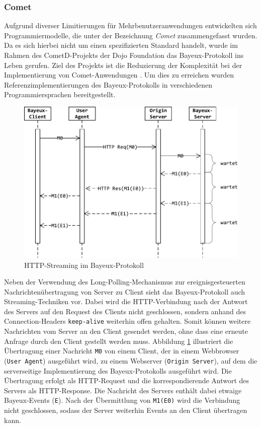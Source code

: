 \documentclass[11pt,a4paper,titlepage]{scrartcl}
\numberwithin{equation}{section}
\begin{document}
\subsubsection{Comet}\label{subsubsec:Comet}
Aufgrund diverser Limitierungen für Mehrbenutzeranwendungen entwickelten sich Programmiermodelle, die unter der Bezeichnung \textit{Comet} \autocite{russell_comet_2006} zusammengefasst wurden. Da es sich hierbei nicht um einen spezifizierten Standard handelt, wurde im Rahmen des CometD-Projekts der Dojo Foundation das Bayeux-Protokoll ins Leben gerufen. Ziel des Projekts ist die Reduzierung der Komplexität bei der Implementierung von Comet-Anwendungen \autocite{russell_cometd_2007}. Um dies zu erreichen wurden Referenzimplementierungen des Bayeux-Protokolls in verschiedenen Programmiersprachen bereitgestellt. \medskip

\begin{figure}[ht] 
	\begin{center}
		\includegraphics[scale=0.9]{img/bayeuxstream.pdf}
		\caption{HTTP-Streaming im Bayeux-Protokoll}
		\label{fig:wsBayeuxStream}
	\end{center}
\end{figure}

\noindent Neben der Verwendung des Long-Polling-Mechanismus zur ereignisgesteuerten Nachrichtenübertragung von Server zu Client sieht das Bayeux-Protokoll auch Streaming-Techniken vor. Dabei wird die HTTP-Verbindung nach der Antwort des Servers auf den Request des Clients nicht geschlossen, sondern anhand des Connection-Headers \texttt{keep-alive} weiterhin offen gehalten. Somit können weitere Nachrichten vom Server an den Client gesendet werden, ohne dass eine erneute Anfrage durch den Client gestellt werden muss. Abbildung \ref{fig:wsBayeuxStream} illustriert die Übertragung einer Nachricht \texttt{M0} von einem Client, der in einem Webbrowser (\texttt{User Agent}) ausgeführt wird, zu einem Webserver (\texttt{Origin Server}), auf dem die serverseitige Implementierung des Bayeux-Protokolls ausgeführt wird. Die Übertragung erfolgt als HTTP-Request und die korrespondierende Antwort des Servers als HTTP-Response. Die Nachricht des Servers enthält dabei etwaige Bayeux-Events (\texttt{E}). Nach der Übermittlung von \texttt{M1(E0)} wird die Verbindung nicht geschlossen, sodass der Server weiterhin Events an den Client übertragen kann. \\
\end{document}
